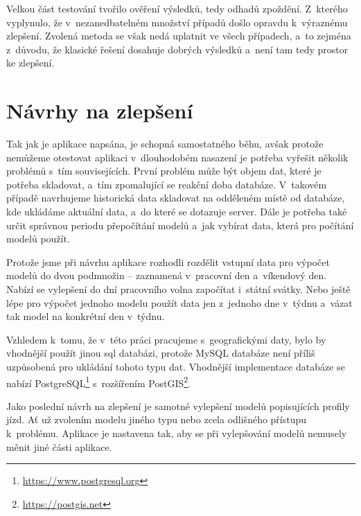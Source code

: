 Velkou část testování tvořilo ověření výsledků, tedy odhadů zpoždění. Z~kterého vyplynulo, že v~nezanedbatelném množství případů došlo opravdu k~výraznému zlepšení. Zvolená metoda se však nedá uplatnit ve všech případech, a~to zejména z~důvodu, že klasické řešení dosahuje dobrých výsledků a~není tam tedy prostor ke zlepšení.


\section*{Návrhy na zlepšení}

Tak jak je aplikace napsána, je schopná samostatného běhu, avšak protože nemůžeme otestovat aplikaci v~dlouhodobém nasazení je potřeba vyřešit několik problémů s~tím souvisejících. První problém může být objem dat, které je potřeba skladovat, a~tím zpomalující se reakční doba databáze. V~takovém případě navrhujeme historická data skladovat na odděleném místě od databáze, kde ukládáme aktuální data, a~do které se dotazuje server. Dále je potřeba také určit správnou periodu přepočítání modelů a~jak vybírat data, která pro počítání modelů použít.


\bigbreak

Protože jsme při návrhu aplikace rozhodli rozdělit vstupní data pro výpočet modelů do dvou podmnožin -- zaznamená v~pracovní den a~víkendový den. Nabízí se vylepšení do dní pracovního volna započítat i~státní svátky. Nebo ještě lépe pro výpočet jednoho modelu použít data jen z~jednoho dne v~týdnu a~vázat tak model na konkrétní den v~týdnu.
\bigbreak


Vzhledem k~tomu, že v~této práci pracujeme s~geografickými daty, bylo by vhodnější použít jinou \gls{sql} databázi, protože MySQL databáze není příliš uzpůsobená pro ukládání tohoto typu dat. Vhodnější implementace databáze se nabízí PostgreSQL\footnote{\url{https://www.postgresql.org}} s~rozšířením PostGIS\footnote{\url{https://postgis.net}}.

\bigbreak

Jako poslední návrh na zlepšení je samotné vylepšení modelů popisujících profily jízd. Ať už zvolením modelu jiného typu nebo zcela odlišného přístupu k~problému. Aplikace je nastavena tak, aby se při vylepšování modelů nemusely měnit jiné části aplikace.
